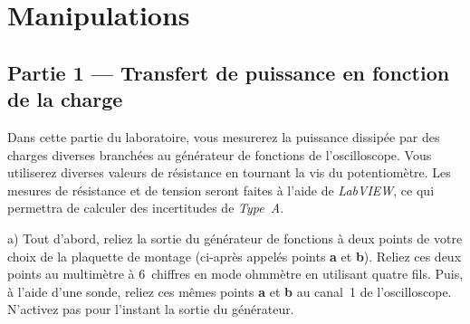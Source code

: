 \documentclass[canadien,12pt,oneside,letterpaper]{article}
\begin{document}
\section{Manipulations}

\subsection{Partie 1 --- Transfert de puissance en fonction de la charge}

Dans cette partie du laboratoire, vous mesurerez la puissance dissipée par des charges diverses branchées au générateur de fonctions de l'oscilloscope. Vous utiliserez diverses valeurs de résistance en tournant la vis du potentiomètre. Les mesures de résistance et de tension seront faites à l'aide de \textit{LabVIEW}, ce qui permettra de calculer des incertitudes de \textit{Type~A}.

a) Tout d'abord, reliez la sortie du générateur de fonctions à deux points de votre choix de la plaquette de montage (ci-après appelés points \textbf{a} et \textbf{b}). Reliez ces deux points au multimètre à 6\textonehalf~chiffres en mode ohmmètre en utilisant quatre fils. Puis, à l'aide d'une sonde, reliez ces mêmes points \textbf{a} et \textbf{b} au canal~1 de l'oscilloscope. N'activez pas pour l'instant la sortie du générateur.
\end{document}
